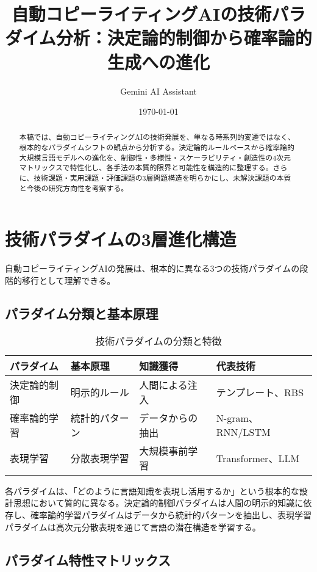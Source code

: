 \documentclass[11pt, a4paper]{article}
\title{自動コピーライティングAIの技術パラダイム分析：決定論的制御から確率論的生成への進化}
\author{Gemini AI Assistant}
\date{\today}
\begin{document}
\maketitle

\begin{abstract}
本稿では、自動コピーライティングAIの技術発展を、単なる時系列的変遷ではなく、根本的なパラダイムシフトの観点から分析する。決定論的ルールベースから確率論的大規模言語モデルへの進化を、制御性・多様性・スケーラビリティ・創造性の4次元マトリックスで特性化し、各手法の本質的限界と可能性を構造的に整理する。さらに、技術課題・実用課題・評価課題の3層問題構造を明らかにし、未解決課題の本質と今後の研究方向性を考察する。
\end{abstract}

\section{技術パラダイムの3層進化構造}

自動コピーライティングAIの発展は、根本的に異なる3つの技術パラダイムの段階的移行として理解できる。

\subsection{パラダイム分類と基本原理}

\begin{table}[h]
\centering
\begin{tabular}{|l|l|l|l|}
\hline
\textbf{パラダイム} & \textbf{基本原理} & \textbf{知識獲得} & \textbf{代表技術} \\
\hline
決定論的制御 & 明示的ルール & 人間による注入 & テンプレート、RBS \\
\hline
確率論的学習 & 統計的パターン & データからの抽出 & N-gram、RNN/LSTM \\
\hline
表現学習 & 分散表現学習 & 大規模事前学習 & Transformer、LLM \\
\hline
\end{tabular}
\caption{技術パラダイムの分類と特徴}
\end{table}

各パラダイムは、「どのように言語知識を表現し活用するか」という根本的な設計思想において質的に異なる。決定論的制御パラダイムは人間の明示的知識に依存し、確率論的学習パラダイムはデータから統計的パターンを抽出し、表現学習パラダイムは高次元分散表現を通じて言語の潜在構造を学習する。

\subsection{パラダイム特性マトリックス}
\end{document}
